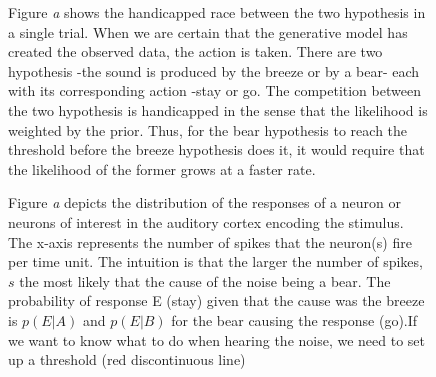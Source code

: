 \documentclass[11pt,twocolumn]{article}
\begin{document}
\begin{figure}[H]
    \caption{Figure \emph{a} shows the handicapped race between the two hypothesis in a single trial. When we are certain that the generative model has created the observed data, the action is taken. There are two hypothesis -the sound is produced by the breeze or by a bear- each with its corresponding action -stay or go. The competition between the two hypothesis is handicapped in the sense that the likelihood is weighted by the prior. Thus, for the bear hypothesis to reach the threshold before the breeze hypothesis does it, it would require that the likelihood of the former grows at a faster rate. %
     }
    \label{fig:reactiontime}
\end{figure}

\begin{figure}[H]
    \hfill
    \caption{Figure \emph{a} depicts the distribution of the responses of a neuron or neurons of interest in the auditory cortex encoding the stimulus. The x-axis represents the number of spikes that the neuron(s) fire per time unit. The intuition is that the larger the number of spikes, $s$ the most likely that the cause of the noise being a bear. The probability of response E (stay) given that the cause was the breeze is $p(E|A)$ and  $p(E|B)$ for the bear causing the response (go).If we want to know what to do when hearing the noise, we need to set up a threshold (red discontinuous line) }
    \label{fig:lkhratio}
\end{figure}
\end{document}
